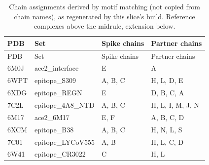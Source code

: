\begin{longtable}{llll}
\caption{Chain assignments derived by motif matching (not copied from chain names), as regenerated by this slice's build. Reference complexes above the midrule, extension below.}\label{tab:chains}\\
\toprule PDB & Set & Spike chains & Partner chains\\\midrule\endfirsthead
\toprule PDB & Set & Spike chains & Partner chains\\\midrule\endhead
\bottomrule\endlastfoot
6M0J & ace2_interface & E & A\\
6WPT & epitope_S309 & A, B, C & H, L, D, E\\
6XDG & epitope_REGN & E & D, B, C, A\\
7C2L & epitope_4A8_NTD & A, B, C & H, L, I, M, J, N\\
\midrule
6M17 & ace2_6M17 & E, F & A, B, C, D\\
6XCM & epitope_B38 & A, B, C & H, N, L, S\\
7C01 & epitope_LYCoV555 & A, B & H, L, C, D\\
6W41 & epitope_CR3022 & C & H, L\\
\end{longtable}

